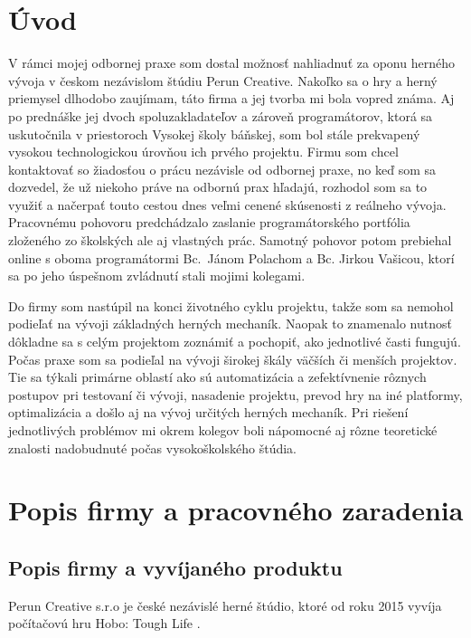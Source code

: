 \documentclass[slovak, bachelorpractice]{diploma}
\begin{document}
\MakeTitlePages

\chapter{Úvod}
\label{sec:Introduction}
V rámci mojej odbornej praxe som dostal možnosť nahliadnuť za oponu herného vývoja v českom nezávislom štúdiu Perun Creative. Nakoľko sa o hry a herný priemysel dlhodobo zaujímam, táto firma a jej tvorba mi bola vopred známa. Aj po prednáške jej dvoch spoluzakladateľov a zároveň programátorov, ktorá sa uskutočnila v priestoroch Vysokej školy báňskej, som bol stále prekvapený vysokou technologickou úrovňou ich prvého projektu. Firmu som chcel kontaktovať so žiadosťou o prácu nezávisle od odbornej praxe, no keď som sa dozvedel, že už niekoho práve na odbornú prax hľadajú, rozhodol som sa to využiť a načerpať touto cestou dnes veľmi cenené skúsenosti z reálneho vývoja. Pracovnému pohovoru predchádzalo zaslanie programátorského portfólia zloženého zo školských ale aj vlastných prác. Samotný pohovor potom prebiehal online s oboma programátormi \mbox{Bc. Jánom} Polachom a Bc. Jirkou Vašicou, ktorí sa po jeho úspešnom zvládnutí stali mojimi kolegami.

Do firmy som nastúpil na konci životného cyklu projektu, takže som sa nemohol podieľať na vývoji základných herných mechaník. Naopak to znamenalo nutnosť dôkladne sa s celým projektom zoznámiť a pochopiť, ako jednotlivé časti fungujú. Počas praxe som sa podieľal na vývoji širokej škály väčších či menších projektov. Tie sa týkali primárne oblastí ako sú automatizácia a zefektívnenie rôznych postupov pri testovaní či vývoji, nasadenie projektu, prevod hry na iné platformy, optimalizácia a došlo aj na vývoj určitých herných mechaník. Pri riešení jednotlivých problémov mi okrem kolegov boli nápomocné aj rôzne teoretické znalosti nadobudnuté počas vysokoškolského štúdia.

\chapter{Popis firmy a pracovného zaradenia}
\label{sec:Firm and me}
\section{Popis firmy a vyvíjaného produktu}
\label{sec:Firm}
Perun Creative s.r.o je české nezávislé herné štúdio, ktoré od roku 2015 vyvíja počítačovú hru Hobo: Tough Life \cite{Perun}.
\end{document}
